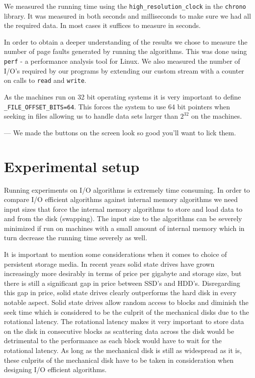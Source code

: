 \documentclass[twoside,11pt,openright]{report}
\begin{document}
We measured the running time using the \texttt{high\_resolution\_clock} in the \texttt{chrono} library. It was measured in both seconds and milliseconds to make sure we had all the required data. In most cases it suffices to measure in seconds.

In order to obtain a deeper understanding of the results we chose to measure the number of page faults generated by running the algorithms. This was done using \texttt{perf} - a performance analysis tool for Linux. We also measured the number of I/O's required by our programs by extending our custom stream with a counter on calls to \texttt{read} and \texttt{write}.

As the machines run on 32 bit operating systems it is very important to define \texttt{\_FILE\_OFFSET\_BITS=64}. This forces the system to use 64 bit pointers when seeking in files allowing us to handle data sets larger than $2^{32}$ on the machines.

\begin{savequote}[0.4\textwidth]
--- We made the buttons on the screen look so good you'll want to lick them.
\end{savequote}
\chapter{Experimental setup}
\label{chp:experimental_setup}
Running experiments on I/O algorithms is extremely time consuming. In order to compare I/O efficient algorithms against internal memory algorithms we need input sizes that force the internal memory algorithms to store and load data to and from the disk (swapping). The input size to the algorithms can be severely minimized if run on machines with a small amount of internal memory which in turn decrease the running time severely as well.

It is important to mention some considerations when it comes to choice of persistent storage media. In recent years solid state drives have grown increasingly more desirably in terms of price per gigabyte and storage size, but there is still a significant gap in price between SSD's and HDD's. Disregarding this gap in price, solid state drives clearly outperforms the hard disk in every notable aspect. Solid state drives allow random access to blocks and diminish the seek time which is considered to be the culprit of the mechanical disks due to the rotational latency.
The rotational latency makes it very important to store data on the disk in consecutive blocks as scattering data across the disk would be detrimental to the performance as each block would have to wait for the rotational latency. As long as the mechanical disk is still as widespread as it is, these culprits of the mechanical disk have to be taken in consideration when designing I/O efficient algorithms.
\end{document}
